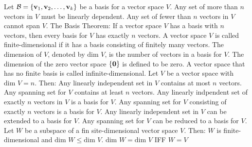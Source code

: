 \documentclass{article}
\begin{document}
\begin{outline}
        \1 Let \(\mathcal B=\{\vb v_1,\vb v_2,\ldots,\vb v_k\}\) be a basis for a vector space $V$. 
            \2 Any set of more than $n$ vectors in $V$ must be linearly dependent. 
            \2 Any set of fewer than $n$ vectors in $V$ cannot span $V$. 
        \1 The Basis Theorem: If a vector space $V$ has a basis with $n$ vectors, then every basis for $V$ has exactly $n$ vectors. 
        \1 A vector space $V$ is called finite-dimensional if it has a basis consisting of finitely many vectors. The dimension of $V$, denoted by \(\text{dim }V\), is the number of vectors in a basis for $V$. The dimension of the zero vector space \(\{\vb 0\}\) is defined to be zero. A vector space that has no finite basis is called infinite-dimensional. 
        \1 Let $V$ be a vector space with \(\text{dim }V=n\). Then: 
            \2 Any linearly independent set in $V$ contains at most $n$ vectors. 
            \2 Any spanning set for $V$ contains at least $n$ vectors. 
            \2 Any linearly indpendent set of exactly $n$ vectors in $V$ is a basis for $V$. 
            \2 Any spanning set for $V$ consisting of exactly $n$ vectors is a basis for $V$. 
            \2 Any linearly independent set in $V$ can be extended to a basis for $V$. 
            \2 Any spanning set for $V$ can be reduced to a basis for $V$. 
        \1 Let $W$ be a subspace of a fin site-dimensional vector space $V$. Then: 
            \2 $W$ is finite-dimensional and \(\text{dim }W\leq\text{dim }V\). 
            \2 \(\text{dim }W=\text{dim }V\) IFF \(W=V\)
    \end{outline}
\end{document}
